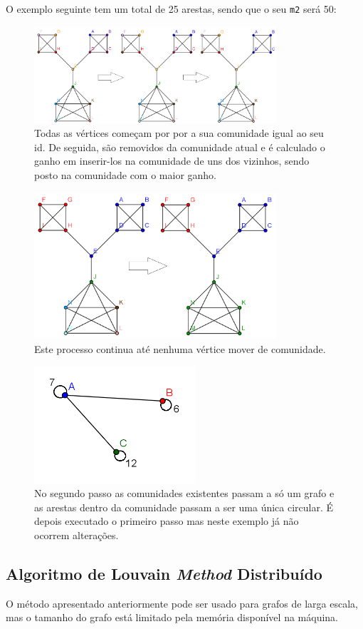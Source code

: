 O exemplo seguinte tem um total de 25 arestas, sendo que o seu \verb|m2| será 50:
\begin{figure}
\includegraphics[width=90mm]{graphf1}
\caption*{Todas as vértices começam por por a sua comunidade igual ao seu id. De seguida, são removidos da comunidade atual e é calculado o ganho em inserir-los na comunidade de uns dos vizinhos, sendo posto na comunidade com o maior ganho.}
\end{figure}
\begin{figure}
\includegraphics[width=90mm]{graphf2}
\caption*{Este processo continua até nenhuma vértice mover de comunidade.}
\end{figure}
\begin{figure}
\includegraphics[width=60mm]{graphf3}
\caption*{No segundo passo as comunidades existentes passam a só um grafo e as arestas dentro da comunidade passam a ser uma única circular. É depois executado o primeiro passo mas neste exemplo já não ocorrem alterações.}
\end{figure}


\newpage
\subsection{Algoritmo de Louvain \textit{Method} Distribuído}
O método apresentado anteriormente pode ser usado para grafos de larga escala, mas o tamanho do grafo está limitado pela memória disponível na máquina.

